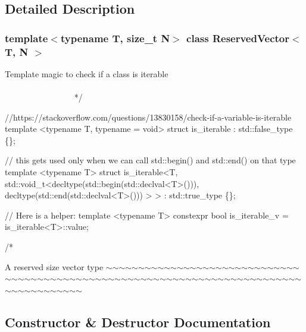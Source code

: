 \subsection{Detailed Description}
\subsubsection*{template$<$typename T, size\+\_\+t N$>$\newline
class Reserved\+Vector$<$ T, N $>$}


\begin{DoxyCode}
    Template magic to check \textcolor{keywordflow}{if} a \textcolor{keyword}{class }is iterable
   ~~~~~~~~~~~~~~~~~~~~~~~~~~~~~~~~~~~~~~~~~~~~~~~~~~~~~~~~~~~~~~~~~~~~~~~~~~~~~~~~~~~~~~~~ */

\textcolor{comment}{//https://stackoverflow.com/questions/13830158/check-if-a-variable-is-iterable}
\textcolor{keyword}{template} <\textcolor{keyword}{typename} T, \textcolor{keyword}{typename} = \textcolor{keywordtype}{void}>
\textcolor{keyword}{struct }is\_iterable : std::false\_type \{\};

\textcolor{comment}{// this gets used only when we can call std::begin() and std::end() on that type}
\textcolor{keyword}{template} <\textcolor{keyword}{typename} T>
\textcolor{keyword}{struct }is\_iterable<T, std::void\_t<decltype(std::begin(std::declval<T>())),
                                  decltype(std::end(std::declval<T>()))
                                 >
                  > : std::true\_type \{\};

\textcolor{comment}{// Here is a helper:}
\textcolor{keyword}{template} <\textcolor{keyword}{typename} T>
constexpr \textcolor{keywordtype}{bool} is\_iterable\_v = is\_iterable<T>::value;


\textcolor{comment}{/*}
\end{DoxyCode}
 A reserved size vector type $\sim$$\sim$$\sim$$\sim$$\sim$$\sim$$\sim$$\sim$$\sim$$\sim$$\sim$$\sim$$\sim$$\sim$$\sim$$\sim$$\sim$$\sim$$\sim$$\sim$$\sim$$\sim$$\sim$$\sim$$\sim$$\sim$$\sim$$\sim$$\sim$$\sim$$\sim$$\sim$$\sim$$\sim$$\sim$$\sim$$\sim$$\sim$$\sim$$\sim$$\sim$$\sim$$\sim$$\sim$$\sim$$\sim$$\sim$$\sim$$\sim$$\sim$$\sim$$\sim$$\sim$$\sim$$\sim$$\sim$$\sim$$\sim$$\sim$$\sim$$\sim$$\sim$$\sim$$\sim$$\sim$$\sim$$\sim$$\sim$$\sim$$\sim$$\sim$$\sim$$\sim$$\sim$$\sim$$\sim$$\sim$$\sim$$\sim$$\sim$$\sim$$\sim$$\sim$$\sim$$\sim$$\sim$$\sim$$\sim$ 

\subsection{Constructor \& Destructor Documentation}
\mbox{\label{class_reserved_vector_aa58994583a0d230b8ebc7ae4d9454465}} 
